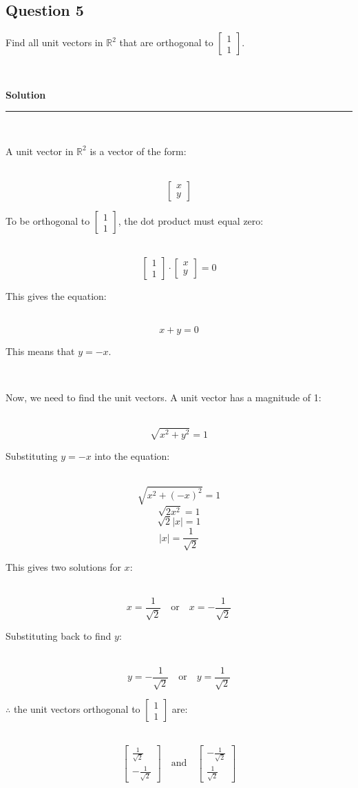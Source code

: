 \documentclass{article}
\begin{document}
\subsection*{Question 5}
\parbox{\textwidth}{Find all unit vectors in $\mathbb{R}^2$ that are orthogonal to $\begin{bmatrix} 1 \\ 1 \end{bmatrix}$.}\\
\parbox{\textwidth}{\textbf{Solution}}
\noindent\rule{\textwidth}{0.4pt}\\
\parbox{\textwidth}{A unit vector in $\mathbb{R}^2$ is a vector of the form:}\\
$$\begin{bmatrix} x \\ y \end{bmatrix}$$
\parbox{\textwidth}{To be orthogonal to $\begin{bmatrix} 1 \\ 1 \end{bmatrix}$, the dot product must equal zero:}\\
$$\begin{bmatrix} 1 \\ 1 \end{bmatrix} \cdot \begin{bmatrix} x \\ y \end{bmatrix} = 0$$
\parbox{\textwidth}{This gives the equation:}\\
$$x + y = 0$$
\parbox{\textwidth}{This means that $y = -x$.}\\
\parbox{\textwidth}{Now, we need to find the unit vectors. A unit vector has a magnitude of 1:}\\
$$\sqrt{x^2 + y^2} = 1$$
\parbox{\textwidth}{Substituting $y = -x$ into the equation:}\\
$$\sqrt{x^2 + (-x)^2} = 1$$
$$\sqrt{2x^2} = 1$$
$$\sqrt{2}|x| = 1$$
$$|x| = \frac{1}{\sqrt{2}}$$
\parbox{\textwidth}{This gives two solutions for $x$:}\\
$$x = \frac{1}{\sqrt{2}} \quad \text{or} \quad x = -\frac{1}{\sqrt{2}}$$
\parbox{\textwidth}{Substituting back to find $y$:}\\
$$y = -\frac{1}{\sqrt{2}} \quad \text{or} \quad y = \frac{1}{\sqrt{2}}$$
\parbox{\textwidth}{$\therefore$ the unit vectors orthogonal to $\begin{bmatrix} 1 \\ 1 \end{bmatrix}$ are:}\\
$$\begin{bmatrix} \frac{1}{\sqrt{2}} \\ -\frac{1}{\sqrt{2}} \end{bmatrix} \quad \text{and} \quad \begin{bmatrix} -\frac{1}{\sqrt{2}} \\ \frac{1}{\sqrt{2}} \end{bmatrix}$$
\end{document}
